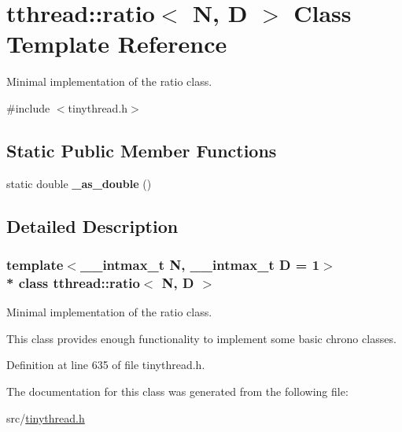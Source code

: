 \hypertarget{classtthread_1_1ratio}{}\section{tthread\+:\+:ratio$<$ N, D $>$ Class Template Reference}
\label{classtthread_1_1ratio}


Minimal implementation of the {\ttfamily ratio} class.  




{\ttfamily \#include $<$tinythread.\+h$>$}

\subsection*{Static Public Member Functions}
\begin{DoxyCompactItemize}
\item 
static double {\bfseries \+\_\+as\+\_\+double} ()\hypertarget{classtthread_1_1ratio_a986bde595c75f91ddb83f390dd43d302}{}\label{classtthread_1_1ratio_a986bde595c75f91ddb83f390dd43d302}

\end{DoxyCompactItemize}


\subsection{Detailed Description}
\subsubsection*{template$<$\+\_\+\+\_\+intmax\+\_\+t N, \+\_\+\+\_\+intmax\+\_\+t D = 1$>$\\*
class tthread\+::ratio$<$ N, D $>$}

Minimal implementation of the {\ttfamily ratio} class. 

This class provides enough functionality to implement some basic {\ttfamily chrono} classes. 

Definition at line 635 of file tinythread.\+h.



The documentation for this class was generated from the following file\+:\begin{DoxyCompactItemize}
\item 
src/\hyperlink{tinythread_8h}{tinythread.\+h}\end{DoxyCompactItemize}
